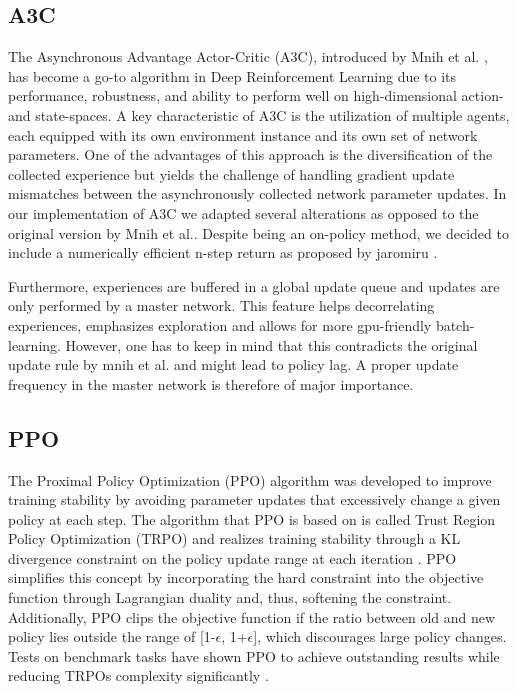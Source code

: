 \documentclass[letterpaper, 10 pt, conference]{ieeeconf}  %
\begin{document}
\subsection{A3C}
The Asynchronous Advantage Actor-Critic (A3C), introduced by Mnih et al. \cite{mnihAsynchronousMethodsDeep2016}, has become a go-to algorithm in 
Deep Reinforcement Learning due to its performance, robustness, and ability to perform well on high-dimensional action- and state-spaces. 
A key characteristic of A3C is the utilization of multiple agents, each equipped with its own environment instance and its own set of network parameters. 
One of the advantages of this approach is the diversification of the collected experience but yields the challenge of handling gradient update 
mismatches between the asynchronously collected network parameter updates. 
In our implementation of A3C we adapted several alterations as opposed to the original version by Mnih et al.. Despite being an on-policy method, we decided 
to include a numerically efficient n-step return as proposed by jaromiru \cite{janischLetMakeA3C}. %

Furthermore, experiences are buffered in a global update 
queue and updates are only performed by a master network. This feature helps decorrelating experiences, emphasizes exploration and allows for more gpu-friendly
batch-learning. However, one has to keep in mind that this contradicts the original update rule by mnih et al. and might lead to policy lag. A proper update 
frequency in the master network is therefore of major importance.

\subsection{PPO}

The Proximal Policy Optimization (PPO) algorithm was developed to improve training stability by avoiding parameter updates that excessively change a given policy at each step. The algorithm that PPO is based on is called Trust Region Policy Optimization (TRPO) and realizes training stability through a KL divergence constraint on the policy update range at each iteration \cite{pmlr-v37-schulman15}. PPO simplifies this concept by incorporating the hard constraint into the objective function through Lagrangian duality and, thus, softening the constraint. Additionally, PPO clips the objective function if the ratio between old and new policy lies outside the range of [1-$\epsilon$, 1+$\epsilon$], which discourages large policy changes. Tests on benchmark tasks have shown PPO to achieve outstanding results while reducing TRPOs complexity significantly \cite{DBLP:journals/corr/SchulmanWDRK17}.
\end{document}
